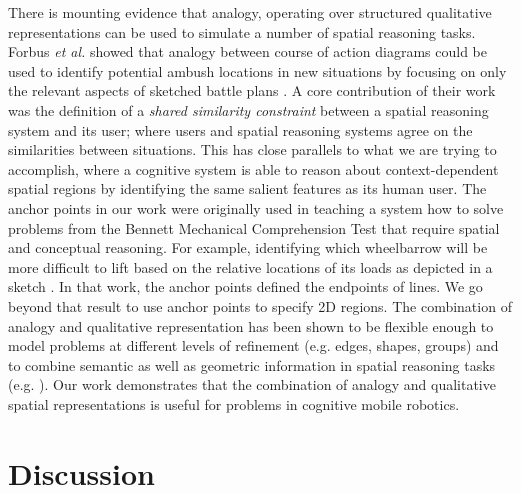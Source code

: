 \documentclass[letterpaper]{article}
\begin{document}

There is mounting evidence that analogy, operating over structured qualitative representations can be used to simulate a number of spatial reasoning tasks. Forbus \textit{et al.} showed that analogy between course of action diagrams could be used to identify potential ambush locations in new situations by focusing on only the relevant aspects of sketched battle plans \cite{Forbus/etal2003}. A core contribution of their work was the definition of a \textit{shared similarity constraint} between a spatial reasoning system and its user; where users and spatial reasoning systems agree on the similarities between situations. This has close parallels to what we are trying to accomplish, where a cognitive system is able to reason about context-dependent spatial regions by identifying the same salient features as its human user. The anchor points in our work were originally used in teaching a system how to solve problems from the Bennett Mechanical Comprehension Test that require spatial and conceptual reasoning. For example, identifying which wheelbarrow will be more difficult to lift based on the relative locations of its loads as depicted in a sketch \cite{Klenk/etal2005}. In that work, the anchor points defined the endpoints of lines. We go beyond that result to use anchor points to specify 2D regions.  The combination of analogy and qualitative representation has been shown to be flexible enough to model problems at different levels of refinement (e.g. edges, shapes, groups) \cite{Lovett&Forbus2011} and to combine semantic as well as geometric information in spatial reasoning tasks (e.g. \cite{Lockwood/etal2008}). Our work demonstrates that the combination of analogy and qualitative spatial representations is useful for problems in cognitive mobile robotics. 

\section{Discussion}

\end{document}

